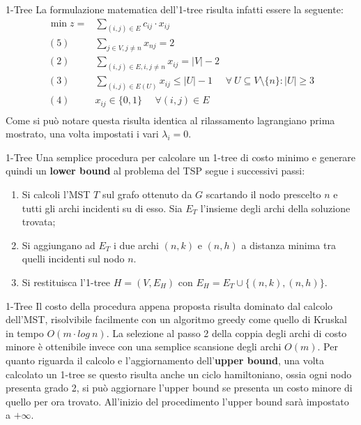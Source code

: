 \documentclass[10pt]{beamer}
\begin{document}
\begin{frame}{1-Tree}
    La formulazione matematica dell'1-tree risulta infatti essere la seguente:
\begin{equation*}
    \begin{split}
        \min z = & \sum_{(i,j) \in E} c_{ij} \cdot x_{ij}\\
        (5)\:\:\:\:\:\: & \sum_{j \in V, j \neq n} x_{nj} = 2 \\
        (2) \:\:\:\:\:\: & \sum_{(i,j)\in E, i, j \neq n} x_{ij} = |V|-2 \\
        (3) \:\:\:\:\:\: & \sum_{(i,j) \in E(U)} x_{ij} \leq |U| - 1 \:\:\:\:\:\: \forall\: U \subseteq V\setminus\{n\} : |U| \geq 3 \\
        (4) \:\:\:\:\:\: & x_{ij} \in \{0,1\} \:\:\:\:\:\: \forall (i,j) \in E\\
    \end{split}
\end{equation*}
Come si può notare questa risulta identica al rilassamento lagrangiano prima mostrato, una volta impostati i vari $\lambda_i = 0$.
\end{frame}

\begin{frame}{1-Tree}
    Una semplice procedura per calcolare un 1-tree di costo minimo e generare quindi un \textbf{lower bound} al problema del TSP segue i successivi passi:
    \begin{enumerate}
        \item Si calcoli l'MST $T$ sul grafo ottenuto da $G$ scartando il nodo prescelto $n$ e tutti gli archi incidenti su di esso. Sia $E_T$ l'insieme degli archi della soluzione trovata;
        \item Si aggiungano ad $E_T$ i due archi $(n,k)$ e $(n,h)$ a distanza minima tra quelli incidenti sul nodo $n$.
        \item Si restituisca l'1-tree $H = (V, E_H)$ con $E_H = E_T \cup \{(n,k),(n,h)\}$.
    \end{enumerate}
\end{frame}

\begin{frame}{1-Tree}
    Il costo della procedura appena proposta risulta dominato dal calcolo dell'MST, risolvibile facilmente con un algoritmo greedy come quello di  Kruskal in tempo $O(m\cdot log\: n)$. La selezione al passo 2 della coppia degli archi di costo minore è ottenibile invece con una semplice scansione degli archi $O(m)$.
    \newline
    \newline
    Per quanto riguarda il calcolo e l'aggiornamento dell'\textbf{upper bound}, una volta calcolato un 1-tree se questo risulta anche un ciclo hamiltoniano, ossia ogni nodo presenta grado 2, si può aggiornare l'upper bound se presenta un costo minore di quello per ora trovato. All'inizio del procedimento l'upper bound sarà impostato a $ + \infty$. 
\end{frame}
\end{document}
